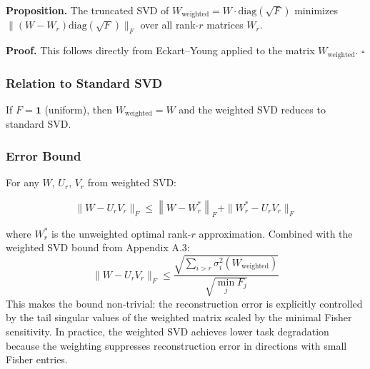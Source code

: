 \textbf{Proposition.} The truncated SVD of $W_\text{weighted} = W \cdot \mathrm{diag}(\sqrt{F})$ 
minimizes $\|(W - W_r) \mathrm{diag}(\sqrt{F})\|_F$ over all rank-$r$ matrices 
$W_r$.

\textbf{Proof.} This follows directly from Eckart--Young applied to the matrix 
$W_\text{weighted}$. $\square$

\subsubsection{Relation to Standard SVD}

If $F = \mathbf{1}$ (uniform), then $W_\text{weighted} = W$ and the weighted 
SVD reduces to standard SVD.

\subsubsection{Error Bound}

For any $W$, $U_r$, $V_r$ from weighted SVD:

\[
\|W - U_r V_r\|_F \leq \left\|W - W^*_r\right\|_F + \|W^*_r - U_r V_r\|_F
\tag{4.14}
\]

where $W^*_r$ is the unweighted optimal rank-$r$ approximation. Combined with the weighted SVD bound from Appendix A.3:
\[
\|W - U_r V_r\|_F \leq \frac{\sqrt{\sum_{i > r} \sigma_i^2(W_\text{weighted})}}{\sqrt{\min_j F_j}}
\]
This makes the bound non-trivial: the reconstruction error is explicitly controlled by the tail singular values of the weighted matrix scaled by the minimal Fisher sensitivity. In practice, the weighted SVD achieves lower task degradation because the weighting suppresses reconstruction error in directions with small Fisher entries.